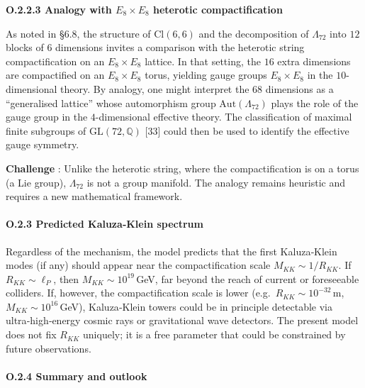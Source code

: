 \documentclass[11pt]{article}
\begin{document}
\textbf{O.2.2.3 Analogy with \(E_8 \times E_8\) heterotic
compactification}

As noted in §6.8, the structure of \(\mathrm{Cl}(6,6)\) and the
decomposition of \(\Lambda_{72}\) into \(12\) blocks of \(6\) dimensions
invites a comparison with the heterotic string compactification on an
\(E_8 \times E_8\) lattice. In that setting, the \(16\) extra dimensions
are compactified on an \(E_8 \times E_8\) torus, yielding gauge groups
\(E_8 \times E_8\) in the \(10\)-dimensional theory. By analogy, one
might interpret the \(68\) dimensions as a ``generalised lattice'' whose
automorphism group \(\mathrm{Aut}(\Lambda_{72})\) plays the role of the
gauge group in the \(4\)-dimensional effective theory. The
classification of maximal finite subgroups of
\(\mathrm{GL}(72,\mathbb{Q})\) {[}33{]} could then be used to identify
the effective gauge symmetry.

\textbf{Challenge} : Unlike the heterotic string, where the
compactification is on a torus (a Lie group), \(\Lambda_{72}\) is not a
group manifold. The analogy remains heuristic and requires a new
mathematical framework.

\hypertarget{o.2.3-predicted-kaluzaklein-spectrum}{%
\paragraph{O.2.3 Predicted Kaluza‑Klein
spectrum}\label{o.2.3-predicted-kaluzaklein-spectrum}}

Regardless of the mechanism, the model predicts that the first
Kaluza‑Klein modes (if any) should appear near the compactification
scale \(M_{KK} \sim 1/R_{KK}\). If \(R_{KK} \sim \ell_P\), then
\(M_{KK} \sim 10^{19}\)\,GeV, far beyond the reach of current or
foreseeable colliders. If, however, the compactification scale is lower
(e.g.~\(R_{KK} \sim 10^{-32}\)\,m, \(M_{KK} \sim 10^{16}\)\,GeV),
Kaluza‑Klein towers could be in principle detectable via
ultra‑high‑energy cosmic rays or gravitational wave detectors. The
present model does not fix \(R_{KK}\) uniquely; it is a free parameter
that could be constrained by future observations.

\hypertarget{o.2.4-summary-and-outlook}{%
\paragraph{O.2.4 Summary and outlook}\label{o.2.4-summary-and-outlook}}
\end{document}
